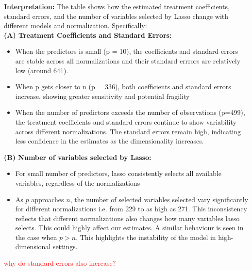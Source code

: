 \textbf{Interpretation:}
The table shows how the estimated treatment coefficients, standard errors, and the number of variables selected by Lasso change with different models and normalization. Specifically:\\
\textbf{(A) Treatment Coefficients and Standard Errors:}
\begin{itemize}
    \item When the predictors is small (p = 10), the coefficients and standard errors are stable across all normalizations and their standard errrors are relatively low (around 641).
    \item When p gets closer to n (p = 336), both coefficients and standard errors increase, showing greater sensitivity and potential fragility
    \item When the number of predictors exceeds the number of observations (p=499), the treatment coefficients and standard errors continue to show variability across different normalizations. The standard errors remain high, indicating less confidence in the estimates as the dimensionality increases.
\end{itemize}

\textbf{(B) Number of variables selected by Lasso:}
\begin{itemize}
    \item For small number of predictors, lasso consistently selects all available variables, regardless of the normalizations
    \item As $p$ approaches $n$, the number of selected variables selected vary significantly for different normalizations i.e. from 229 to as high as 271. This inconsistency reflects that different normalizations also changes how many variables lasso selects. This could highly affect our estimates. A similar behaviour is seen in the case when $p>n$. This highlights the instability of the model in high-dimensional settings. 
\end{itemize}

\textcolor{red}{why do standard errors also increase?}